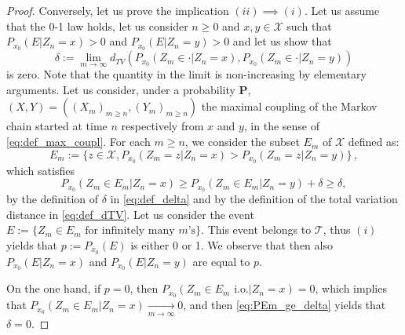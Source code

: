 \documentclass[12pt,a4paper]{article}
\newcommand{\1}[1]{{\mathbf 1}{\{#1\}}}
\newcommand{\8}{{\infty}}
\begin{document}
\begin{proof}
  Conversely, let us prove the implication $(ii)\implies (i)$. Let us assume that the 0-1 law holds, let us consider $n\ge 0$ and $x,y  \in \mathcal{X}$ such that $P_{x_0}(E | Z_n = x)>0$ and $ P_{x_0}(E | Z_n = y) >0$ and let us show that
  \begin{equation}\label{eq:def_delta}
    \delta :=  \lim_{m\to\infty} d_{TV}(P_{x_0}(Z_m \in \cdot | Z_n = x), P_{x_0}(Z_m \in \cdot | Z_n = y)) 
  \end{equation}
  is zero. Note that the quantity in the limit is non-increasing by elementary arguments.
  Let us consider, under a probability $\mathbf{P}$, $(X,Y)=((X_m)_{m\ge n},(Y_m)_{m\ge n} )$ the maximal coupling of the Markov chain started at time $n$ respectively from $x$ and $y$, in the sense of \eqref{eq:def_max_coupl}. For each $m\ge n$, we consider the subset $E_m$ of $\mathcal{X}$ defined as:
  \[E_m:=\{z \in \mathcal{X}, P_{x_0}(Z_m = z | Z_n = x) > P_{x_0}(Z_m = z | Z_n = y)  \} \,, \]
  which satisfies 
  \begin{equation}\label{eq:PEm_ge_delta}
  P_{x_0}(Z_m \in E_m | Z_n = x) 
   \ge P_{x_0}(Z_m \in E_m | Z_n = y)  
   + \delta 
   \ge \delta,
  \end{equation}
  by the definition of $\delta$ in \eqref{eq:def_delta} and by the definition of the total variation distance in \eqref{eq:def_dTV}. 
  Let us consider the event 
  $E:=\{Z_m \in E_m \text{ for infinitely many } m \text{'s}\}$. 
  This event belongs to $\mathcal{T}$, thus $(i)$ yields that $p:=P_{x_0}(E)$ is either 0 or 1. We observe that then also $P_{x_0}( E | Z_n = x)$ and $P_{x_0}(E | Z_n = y)$ are equal to $p$. 
  
  On the one hand, if $p=0$, then $P_{x_0}( Z_m \in E_m \text{ i.o.} |Z_n=x )=0$, which implies that $P_{x_0}(Z_m \in E_m |Z_n=x )  \underset{m\to\infty}\longrightarrow 0$, and then \eqref{eq:PEm_ge_delta} yields that $\delta=0$. 


\end{proof}
\end{document}
